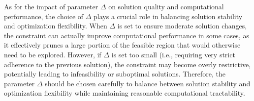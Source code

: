 \documentclass[preprint,12pt,authoryear]{elsarticle}
\begin{document}
As for the impact of parameter $\Delta$ on solution quality and computational performance, the choice of $\Delta$ plays a crucial role in balancing solution stability and optimization flexibility. When $\Delta$ is set to ensure moderate solution changes, the constraint can actually improve computational performance in some cases, as it effectively prunes a large portion of the feasible region that would otherwise need to be explored. However, if $\Delta$ is set too small (i.e., requiring very strict adherence to the previous solution), the constraint may become overly restrictive, potentially leading to infeasibility or suboptimal solutions. Therefore, the parameter $\Delta$ should be chosen carefully to balance between solution stability and optimization flexibility while maintaining reasonable computational tractability.





\end{document}
